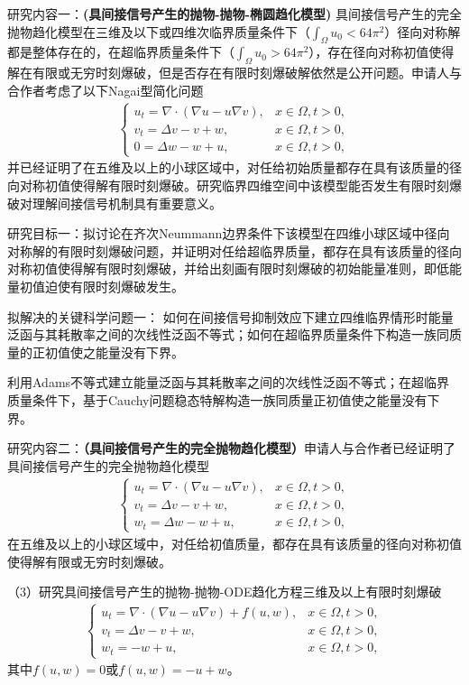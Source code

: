 \documentclass[12pt]{article}
\begin{document}
研究内容一：\textbf{(具间接信号产生的抛物-抛物-椭圆趋化模型)}
具间接信号产生的完全抛物趋化模型在三维及以下或四维次临界质量条件下（$\int_\Omega u_0< 64\pi^2$）径向对称解都是整体存在的，在超临界质量条件下（$\int_\Omega u_0> 64\pi^2$），存在径向对称初值使得解在有限或无穷时刻爆破，但是否存在有限时刻爆破解依然是公开问题。申请人与合作者考虑了以下Nagai型简化问题
\begin{align}
    \begin{cases}
      \label{sys: ks isp ppe}
        u_t =  \nabla\cdot(\nabla u - u\nabla v),& x\in\Omega, t>0,\\
        v_t =  \Delta v - v + w,& x\in\Omega,	 t>0,\\
        0   = \Delta w - w + u, & x\in\Omega, t > 0, 
    \end{cases}
\end{align}
并已经证明了在五维及以上的小球区域中，对任给初始质量都存在具有该质量的径向对称初值使得解有限时刻爆破。研究临界四维空间中该模型能否发生有限时刻爆破对理解间接信号机制具有重要意义。

研究目标一：拟讨论在齐次Neummann边界条件下该模型在四维小球区域中径向对称解的有限时刻爆破问题，并证明对任给超临界质量，都存在具有该质量的径向对称初值使得解有限时刻爆破，并给出刻画有限时刻爆破的初始能量准则，即低能量初值迫使有限时刻爆破发生。

拟解决的关键科学问题一：
如何在间接信号抑制效应下建立四维临界情形时能量泛函与其耗散率之间的次线性泛函不等式；如何在超临界质量条件下构造一族同质量的正初值使之能量没有下界。

利用Adams不等式建立能量泛函与其耗散率之间的次线性泛函不等式；在超临界质量条件下，基于Cauchy问题稳态特解构造一族同质量正初值使之能量没有下界。

研究内容二：\textbf{（具间接信号产生的完全抛物趋化模型）}申请人与合作者已经证明了具间接信号产生的完全抛物趋化模型
\begin{align}
    \begin{cases}
      \label{sys: ks isp ppp}
        u_t =  \nabla\cdot(\nabla u - u\nabla v),& x\in\Omega, t>0,\\
        v_t =  \Delta v - v + w,& x\in\Omega,	 t>0,\\
        w_t  = \Delta w - w + u, & x\in\Omega, t > 0, 
    \end{cases}
\end{align}
在五维及以上的小球区域中，对任给初值质量，都存在具有该质量的径向对称初值使得解有限或无穷时刻爆破。

（3）研究具间接信号产生的抛物-抛物-ODE趋化方程三维及以上有限时刻爆破
\begin{align}
    \begin{cases}
      \label{sys: ks isp ppodef}
        u_t =  \nabla\cdot(\nabla u - u\nabla v) + f(u,w),& x\in\Omega, t>0,\\
        v_t =  \Delta v - v + w,& x\in\Omega,	 t>0,\\
        w_t  = - w + u, & x\in\Omega, t > 0, 
    \end{cases}
\end{align}
其中$f(u,w)=0$或$f(u,w)=-u+w$。
\end{document}
